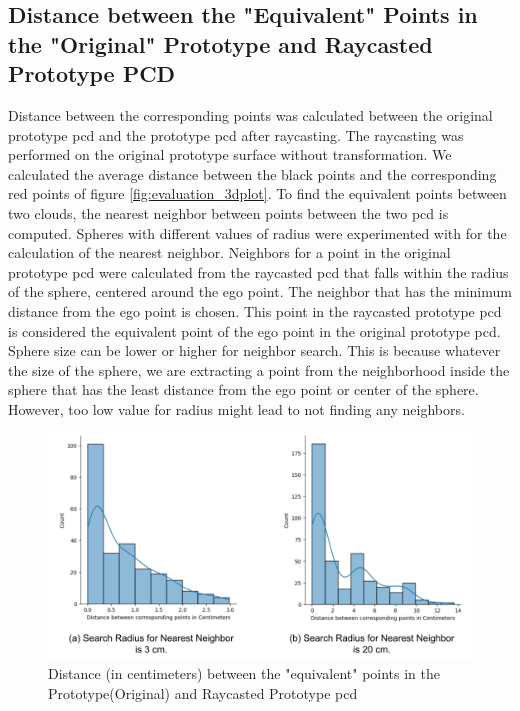 \subsection{Distance between the "Equivalent" Points in the "Original" Prototype and Raycasted Prototype PCD}
Distance between the corresponding points was calculated between the original prototype \acrshort{pcd} and the prototype \acrshort{pcd} after raycasting. The raycasting was performed on the original prototype surface without transformation. We calculated the average distance between the black points and the corresponding red points of figure \ref{fig:evaluation_3dplot}. To find the equivalent points between two clouds, the nearest neighbor between points between the two \acrshort{pcd} is computed. Spheres with different values of radius were experimented with for the calculation of the nearest neighbor. Neighbors for a point in the original prototype \acrshort{pcd} were calculated from the raycasted \acrshort{pcd} that falls within the radius of the sphere, centered around the ego point. The neighbor that has the minimum distance from the ego point is chosen. This point in the raycasted prototype \acrshort{pcd} is considered the equivalent point of the ego point in the original prototype \acrshort{pcd}. Sphere size can be lower or higher for neighbor search. This is because whatever the size of the sphere, we are extracting a point from the neighborhood inside the sphere that has the least distance from the ego point or center of the sphere. However, too low value for radius might lead to not finding any neighbors.
\begin{figure}[htbp]
    \centering
    \includegraphics[width=1\linewidth]{97_graphics/evaluation/distn_betn_corresponding_points_in_raycasting.pdf}
    \caption{Distance (in centimeters) between the "equivalent" points in the Prototype(Original) and Raycasted Prototype \acrshort{pcd}}
    \label{fig:evaluation_distn_corresponding_points}
\end{figure}

